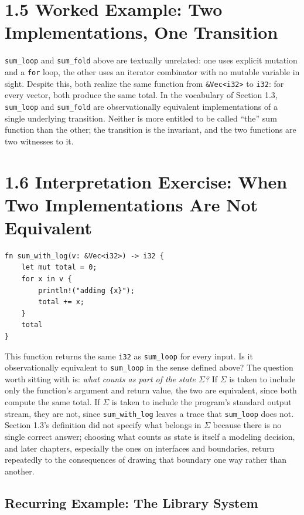 \documentclass[11pt]{book}
\begin{document}
\section*{1.5 Worked Example: Two Implementations, One Transition}

\texttt{sum\_loop} and \texttt{sum\_fold} above are textually unrelated: one uses explicit mutation and a \texttt{for} loop, the other uses an iterator combinator with no mutable variable in sight. Despite this, both realize the same function from \texttt{\&Vec<i32>} to \texttt{i32}: for every vector, both produce the same total. In the vocabulary of Section 1.3, \texttt{sum\_loop} and \texttt{sum\_fold} are observationally equivalent implementations of a single underlying transition. Neither is more entitled to be called ``the'' sum function than the other; the transition is the invariant, and the two functions are two witnesses to it.

\section*{1.6 Interpretation Exercise: When Two Implementations Are Not Equivalent}

\begin{lstlisting}
fn sum_with_log(v: &Vec<i32>) -> i32 {
    let mut total = 0;
    for x in v {
        println!("adding {x}");
        total += x;
    }
    total
}
\end{lstlisting}

This function returns the same \texttt{i32} as \texttt{sum\_loop} for every input. Is it observationally equivalent to \texttt{sum\_loop} in the sense defined above? The question worth sitting with is: \emph{what counts as part of the state $\Sigma$?} If $\Sigma$ is taken to include only the function's argument and return value, the two are equivalent, since both compute the same total. If $\Sigma$ is taken to include the program's standard output stream, they are not, since \texttt{sum\_with\_log} leaves a trace that \texttt{sum\_loop} does not. Section 1.3's definition did not specify what belongs in $\Sigma$ because there is no single correct answer; choosing what counts as state is itself a modeling decision, and later chapters, especially the ones on interfaces and boundaries, return repeatedly to the consequences of drawing that boundary one way rather than another.

\subsection*{Recurring Example: The Library System}
\end{document}
